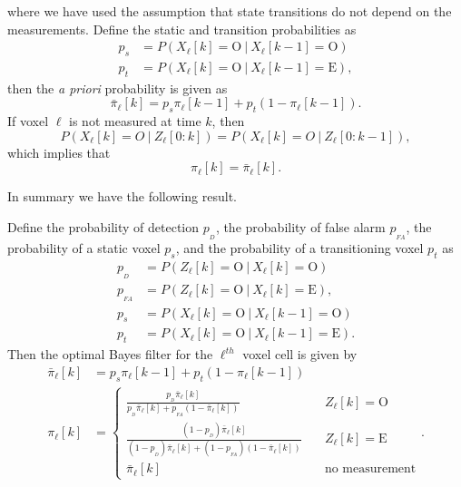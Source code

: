 where we have used the assumption that state transitions do not depend on the measurements.  Define the static and transition probabilities as
\begin{align*}
p_{s} &= P(X_\ell[k] = \text{O}~|~ X_\ell[k-1]=\text{O}) \\
p_ {t}&= P(X_\ell[k] = \text{O}~|~ X_\ell[k-1]=\text{E}),
\end{align*}
then the {\em a priori} probability is given as
\[
\bar{\pi}_\ell[k] = p_{s}\pi_\ell[k-1] + p_{t}(1-\pi_\ell[k-1]).
\]
If voxel $\ell$ is not measured at time $k$, then 
\[
P(X_\ell[k]=O ~|~ Z_\ell[0:k]) = P(X_\ell[k]=O ~|~ Z_\ell[0:k-1]),
\]
which implies that
\[
\pi_\ell[k] = \bar{\pi}_\ell[k].
\]

In summary we have the following result.
\begin{lemma}
	Define the probability of detection $p_{_D}$, the probability of false alarm $p_{_{FA}}$, the probability of a static voxel $p_{s}$, and the probability of a transitioning voxel $p_{t}$ as
	\begin{align*}
		p_{_D} &= P(Z_\ell[k]=\text{O} ~|~ X_\ell[k]=\text{O}) \\
		p_{_{FA}} &= P(Z_\ell[k]=\text{O} ~|~ X_\ell[k]=\text{E}), \\
		p_s &= P(X_\ell[k] = \text{O}~|~ X_\ell[k-1]=\text{O}) \\
		p_t &= P(X_\ell[k] = \text{O}~|~ X_\ell[k-1]=\text{E}).
	\end{align*}
	Then the optimal Bayes filter for the $\ell^{th}$ voxel cell is given by
	\begin{align*}
		\bar{\pi}_\ell[k] &= p_{s}\pi_\ell[k-1] + p_{t}(1-\pi_\ell[k-1]) \\
		\pi_\ell[k] &= \begin{cases}
		\frac{p_{_D} \bar{\pi}_\ell[k]}{p_{_D}\bar{\pi}_\ell[k]+p_{_{FA}}(1-\bar{\pi}_\ell[k])} &\quad Z_\ell[k]=\text{O} \\
		\frac{(1-p_{_D}) \bar{\pi}_\ell[k]}{(1-p_{_D})\bar{\pi}_\ell[k]+(1-p_{_{FA}})(1-\bar{\pi}_\ell[k])} &\quad Z_\ell[k]=\text{E}  \\
		\bar{\pi}_\ell[k] &\quad \text{no measurement}
		\end{cases}.
	\end{align*}
	
	
\end{lemma}









